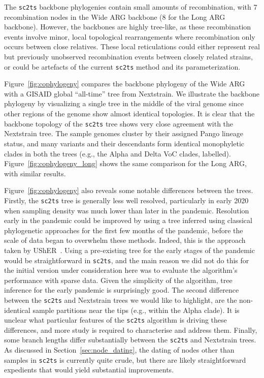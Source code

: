 \documentclass{article}
\begin{document}
The \texttt{sc2ts} backbone phylogenies contain small amounts of recombination,
with 7 recombination nodes in the Wide ARG backbone (8 for the Long ARG
backbone). However, the backbones are highly tree-like, as these
recombination events involve minor, local topological rearrangements
where recombination only occurs between close relatives.
These local reticulations could either represent
real but previously unobserved recombination events between closely related strains,
or could be artefacts of the current \texttt{sc2ts} method and its parameterization.

Figure~\ref{fig:cophylogeny} compares the backbone phylogeny of the Wide ARG with
a GISAID global ``all-time'' tree from Nextstrain.
We illustrate the backbone phylogeny by visualizing
a single tree in the middle of the viral genome
since other regions of the
genome show almost identical topologies.
It is clear that the backbone topology of the \texttt{sc2ts} tree shows very close
agreement with the Nextstrain tree. The sample genomes cluster by their
assigned Pango lineage status, and many variants and their descendants form
identical monophyletic clades in both the trees (e.g., the Alpha and Delta VoC
clades, labelled).
Figure~\ref{fig:cophylogeny_long} shows the same comparison for the Long ARG, with similar results.

Figure~\ref{fig:cophylogeny} also reveals some notable differences between the
trees. Firstly, the \texttt{sc2ts} tree is generally less well resolved,
particularly in early 2020 when sampling density was much lower than
later in the pandemic. Resolution early in the pandemic could be improved
by using a tree inferred using classical phylogenetic
approaches for the first few months of the pandemic, before the scale of
data began to overwhelm these methods. Indeed, this is the approach
taken by UShER~\citep{Turakhia2021-ur}. Using a pre-existing tree for
the early stages of the pandemic would be straightforward in \texttt{sc2ts},
and the main reason we did not do this for the initial
version under consideration here was to evaluate the algorithm's
performance with sparse data. Given
the simplicity of the algorithm, tree inference for the early pandemic
is surprisingly good.
The second difference between the \texttt{sc2ts} and Nextstrain trees
we would like to highlight, are the non-identical sample partitions
near the tips (e.g., within the Alpha clade). It is unclear what
particular features of the \texttt{sc2ts} algorithm is driving these
differences, and more study is required to characterise and address them.
Finally, some branch lengths differ substantially between the \texttt{sc2ts}
and Nextstrain trees.
As discussed in Section~\ref{sec:node_dating}, the dating of nodes
other than samples in \texttt{sc2ts} is currently quite crude,
but there are likely straightforward expedients that would yield
substantial improvements.
\end{document}
